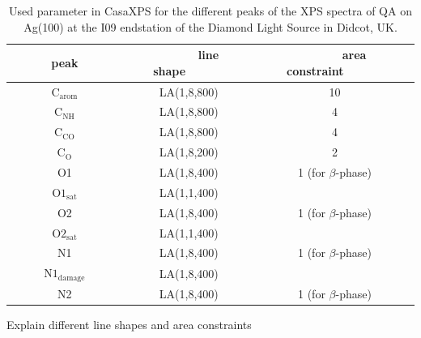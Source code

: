 \begin{table}[H]
	\centering
	\caption{Used parameter in CasaXPS\autocite{CasaSoftwareLtd2022} for the different peaks of the \ac{XPS} spectra of \ac{QA} on Ag(100) at the I09 endstation of the Diamond Light Source in Didcot, UK.}
\begin{tabular}{|c|c|c|}
	\hline
	~~~~~~peak~~~~~~ & ~~~~~~line shape~~~~~~ & ~~~~~~area constraint~~~~~~ \\
	\hline
	$\mathrm{C_{arom}}$ & LA(1,8,800) & 10 \\
	\hline
	$\mathrm{C_{NH}}$ & LA(1,8,800) & 4 \\
	\hline
	$\mathrm{C_{CO}}$ & LA(1,8,800) & 4 \\
	\hline
	$\mathrm{C_{O}}$ & LA(1,8,200) & 2 \\
	\hline \hline
	O1 & LA(1,8,400) & 1 (for $\beta$-phase) \\
	\hline
	$\mathrm{O1_{sat}}$ & LA(1,1,400) &  \\
	\hline
	O2 & LA(1,8,400) & 1 (for $\beta$-phase) \\
	\hline
	$\mathrm{O2_{sat}}$  & LA(1,1,400) &  \\
	\hline \hline
	N1 & LA(1,8,400) & 1 (for $\beta$-phase) \\
	\hline
	$\mathrm{N1_{damage}}$  & LA(1,8,400) &  \\
	\hline
	N2 & LA(1,8,400) & 1 (for $\beta$-phase) \\
	\hline
\end{tabular}
	\label{tab:casa}
\end{table}

Explain different line shapes and area constraints

\cleardoublepage
